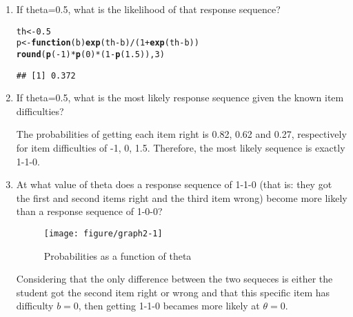 \documentclass{article}\usepackage[]{graphicx}\usepackage[]{color}
\makeatletter
\def\maxwidth{ %
  \ifdim\Gin@nat@width>\linewidth
    \linewidth
  \else
    \Gin@nat@width
  \fi
}
\newcommand{\hlnum}[1]{\textcolor[rgb]{0.686,0.059,0.569}{#1}}%
\newcommand{\hlopt}[1]{\textcolor[rgb]{0,0,0}{#1}}%
\newcommand{\hlstd}[1]{\textcolor[rgb]{0.345,0.345,0.345}{#1}}%
\newcommand{\hlkwa}[1]{\textcolor[rgb]{0.161,0.373,0.58}{\textbf{#1}}}%
\newcommand{\hlkwb}[1]{\textcolor[rgb]{0.69,0.353,0.396}{#1}}%
\newcommand{\hlkwc}[1]{\textcolor[rgb]{0.333,0.667,0.333}{#1}}%
\newcommand{\hlkwd}[1]{\textcolor[rgb]{0.737,0.353,0.396}{\textbf{#1}}}%
\newenvironment{kframe}{%
 \def\at@end@of@kframe{}%
 \ifinner\ifhmode%
  \def\at@end@of@kframe{\end{minipage}}%
  \begin{minipage}{\columnwidth}%
 \fi\fi%
 \def\FrameCommand##1{\hskip\@totalleftmargin \hskip-\fboxsep
 \colorbox{shadecolor}{##1}\hskip-\fboxsep
     \hskip-\linewidth \hskip-\@totalleftmargin \hskip\columnwidth}%
 \MakeFramed {\advance\hsize-\width
   \@totalleftmargin\z@ \linewidth\hsize
   \@setminipage}}%
 {\par\unskip\endMakeFramed%
 \at@end@of@kframe}
\newenvironment{knitrout}{}{} %
\makeatother
\begin{document}
\begin{enumerate}
\begin{knitrout}
\end{knitrout}

\item If theta=0.5, what is the likelihood of that response sequence?

\begin{knitrout}
\color{fgcolor}\begin{kframe}
\begin{alltt}
\hlstd{th}\hlkwb{<-}\hlnum{0.5}
\hlstd{p}\hlkwb{<-}\hlkwa{function}\hlstd{(}\hlkwc{b}\hlstd{)} \hlkwd{exp}\hlstd{(th}\hlopt{-}\hlstd{b)}\hlopt{/}\hlstd{(}\hlnum{1}\hlopt{+}\hlkwd{exp}\hlstd{(th}\hlopt{-}\hlstd{b))}
\hlkwd{round}\hlstd{(}\hlkwd{p}\hlstd{(}\hlopt{-}\hlnum{1}\hlstd{)}\hlopt{*}\hlkwd{p}\hlstd{(}\hlnum{0}\hlstd{)}\hlopt{*}\hlstd{(}\hlnum{1}\hlopt{-}\hlkwd{p}\hlstd{(}\hlnum{1.5}\hlstd{)),}\hlnum{3}\hlstd{)}
\end{alltt}
\begin{verbatim}
## [1] 0.372
\end{verbatim}
\end{kframe}
\end{knitrout}

\item If theta=0.5, what is the most likely response sequence given the known item difficulties? 

The probabilities of getting each item right is 0.82, 0.62 and 0.27, respectively for item difficulties of -1, 0, 1.5. Therefore, the most likely sequence is exactly 1-1-0.

\item At what value of theta does a response sequence of 1-1-0 (that is: they got the first and second items right and the third item wrong) become more likely than a response sequence of 1-0-0?

\begin{knitrout}
\color{fgcolor}\begin{figure}[H]

{\centering \texttt{[image: figure/graph2-1]} 

}

\caption[Probabilities as a function of theta]{Probabilities as a function of theta}\label{fig:graph2}
\end{figure}


\end{knitrout}

Considering that the only difference between the two sequeces is either the student got the second item right or wrong and that this specific item has difficulty $b = 0$, then getting 1-1-0 becames more likely at $\theta = 0$.


\end{enumerate}
\end{document}
